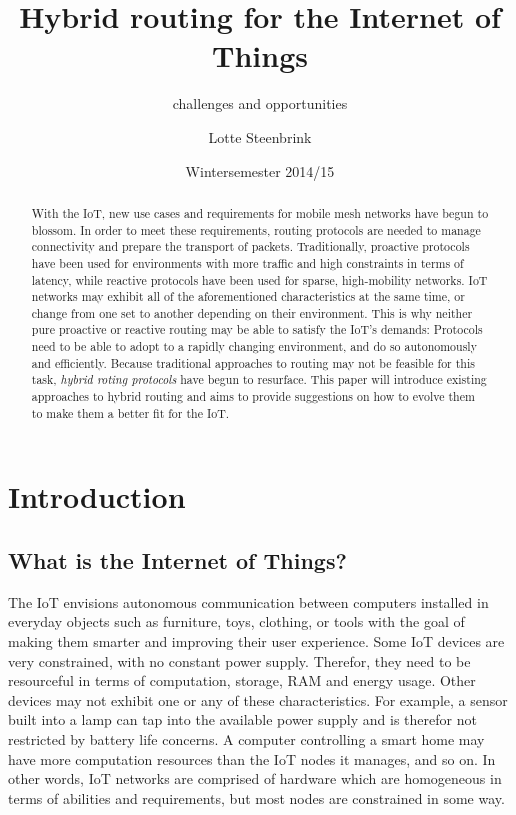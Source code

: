\documentclass[a4paper,10pt]{scrartcl}
\begin{document}
\title{Hybrid routing for the Internet of Things}
\subtitle{challenges and opportunities}
\author{Lotte Steenbrink}
\date{Wintersemester 2014/15}
\maketitle

\begin{abstract}
With the \gls{IoT}, new use cases and requirements for mobile mesh networks have begun to blossom. In order to meet these requirements, routing protocols are needed to manage connectivity and prepare the transport of packets. Traditionally, proactive protocols have been used for environments with more traffic and high constraints in terms of latency, while reactive protocols have been used for sparse, high-mobility networks. IoT networks may exhibit all of the aforementioned characteristics at the same time, or change from one set to another depending on their environment. This is why neither pure proactive or reactive routing may be able to satisfy the IoT's demands: Protocols need to be able to adopt to a rapidly changing environment, and do so autonomously and efficiently.
Because traditional approaches to routing may not be feasible for this task, \emph{hybrid roting protocols} have begun to resurface. This paper will introduce existing approaches to hybrid routing and aims to provide suggestions on how to evolve them to make them a better fit for the IoT.

\end{abstract}

\section{Introduction}
\label{sec:Intro}


\subsection{What is the Internet of Things?}
\label{subsec:IoT}
The \gls{IoT} envisions autonomous communication between computers installed in everyday objects such as furniture, toys, clothing, or tools with the goal of making them smarter and improving their user experience. Some IoT devices are very constrained, with no constant power supply. Therefor, they need to be resourceful in terms of computation, storage, RAM and energy usage. Other devices may not exhibit one or any of these characteristics. For example, a sensor built into a lamp can tap into the available power supply and is therefor not restricted by battery life concerns. A computer controlling a smart home may have more computation resources than the IoT nodes it manages, and so on. In other words, IoT networks are comprised of hardware which are homogeneous in terms of abilities and requirements, but most nodes are constrained in some way.\\
\end{document}
